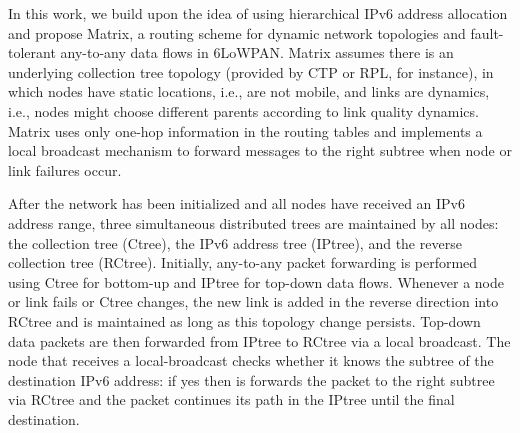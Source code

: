 
In this work, we build upon the idea of using hierarchical IPv6
address allocation and propose Matrix, a routing scheme for dynamic
network topologies and fault-tolerant any-to-any data flows in
6LoWPAN. Matrix assumes there is an underlying collection tree
topology (provided by CTP or RPL, for instance), in which nodes have
static locations, i.e., are not mobile, and links are dynamics,
i.e., nodes might choose different parents according to link quality
dynamics. Matrix uses only one-hop information in the routing tables
and implements a local broadcast mechanism to forward messages to
the right subtree when node or link failures occur.

After the network has been initialized and all nodes
have received an IPv6 address range, three simultaneous distributed trees are
maintained by all nodes:
the collection tree (Ctree), the IPv6 address tree (IPtree), and the
reverse collection tree (RCtree).
Initially, any-to-any packet forwarding is performed using Ctree for
bottom-up and IPtree for top-down data flows. Whenever a node or
link fails or Ctree changes, the new link is added in the reverse
direction into RCtree and is maintained as long as this topology
change persists. Top-down data packets are then forwarded from
IPtree to RCtree via a local broadcast. The node that receives a
local-broadcast checks whether it knows the subtree of the
destination IPv6 address: if yes then is forwards the packet to the
right subtree via RCtree and the packet continues its path in the
IPtree until the final destination.


